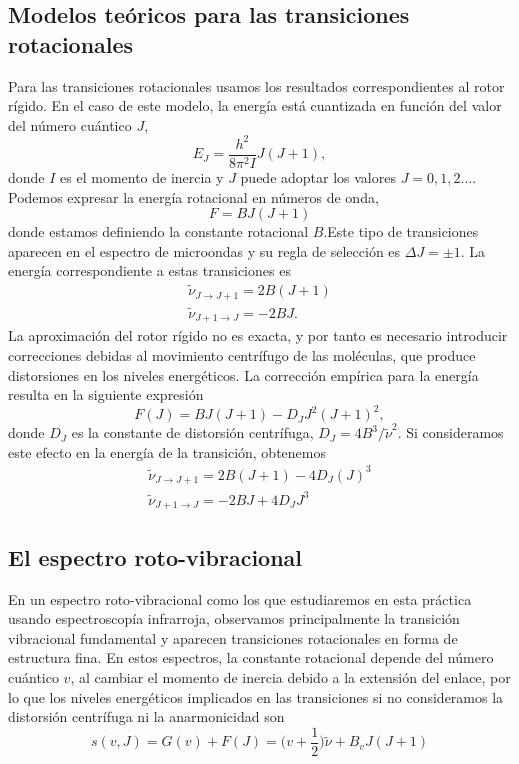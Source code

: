 \documentclass{tufte-book}
\begin{document}
\subsection{Modelos teóricos para las transiciones rotacionales}
Para las transiciones rotacionales usamos los resultados  
correspondientes al rotor rígido. En el caso de este modelo,  la
energía está cuantizada en función del valor del número cuántico
$J$,
\begin{equation}
    E_J=\frac{h^2}{8\pi^2I}J(J+1),
\end{equation}
donde $I$ es el momento de inercia y $J$ puede adoptar los valores 
$J=0,1,2...$. Podemos expresar la energía rotacional en números de onda,
\begin{equation}
    F=BJ(J+1)
\end{equation}
donde estamos definiendo la constante rotacional $B$.Este
tipo de transiciones aparecen en el espectro de microondas y su
regla de selección es $\Delta J=\pm 1$. La energía correspondiente 
a estas transiciones es
\begin{gather}
    \tilde{\nu}_{J\rightarrow J+1} = 2B(J+1)\\
    \tilde{\nu}_{J+1\rightarrow J} = -2BJ.
\end{gather}
La aproximación del rotor rígido no es exacta, y por tanto es necesario
introducir correcciones debidas al movimiento centrífugo de las moléculas,
que produce distorsiones en los niveles energéticos. La corrección
empírica para la energía resulta en la siguiente expresión
\begin{equation}
    F(J)=BJ(J+1) - D_JJ^2(J+1)^2,
\end{equation}
donde $D_J$ es la constante de distorsión centrífuga, 
$D_J=4B^3/\tilde{\nu}^2$. Si consideramos este efecto en la energía 
de la transición, obtenemos
\begin{align}
    \tilde{\nu}_{J\rightarrow J+1} = 2B(J+1) - 4D_J(J)^3\\
    \tilde{\nu}_{J+1\rightarrow J} = -2BJ + 4D_JJ^3
\end{align}

\subsection{El espectro roto-vibracional}
En un espectro roto-vibracional como los que estudiaremos en
esta práctica usando espectroscopía infrarroja, observamos 
principalmente la transición vibracional fundamental y 
aparecen transiciones rotacionales en forma de estructura
fina. En estos espectros, la constante rotacional depende del 
número cuántico $v$, al cambiar el momento de inercia debido a
la extensión del enlace, por lo que los niveles energéticos implicados
en las transiciones si no consideramos la distorsión centrífuga ni la 
anarmonicidad son
\begin{equation}
    s(v, J) = G(v) + F(J) = \Big(v+\frac{1}{2}\Big)\tilde{\nu} + B_vJ(J+1)
\end{equation}
\end{document}
